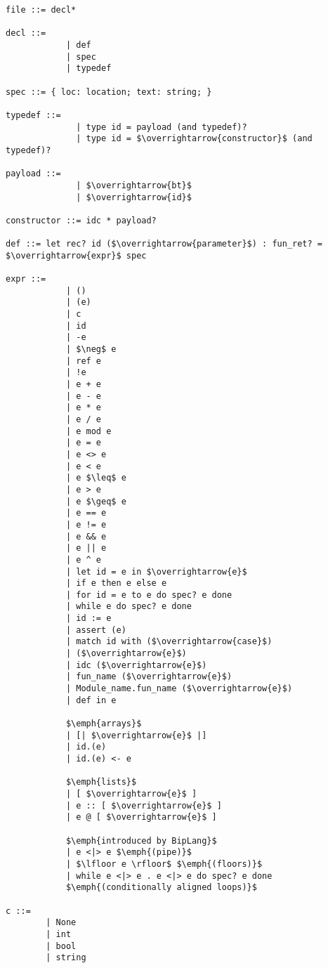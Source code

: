 \begin{lstlisting}[mathescape, basicstyle=\ttfamily, columns=flexible,
                    emph={type, and, let, rec, if, then, else, mod, in, for, while, do, done, to, begin, end, assert, match, with, of, open, include,ref},
                    emphstyle=\ttfamily\bfseries\color{myorange}]
file ::= decl*

decl ::= 
            | def
            | spec
            | typedef

spec ::= { loc: location; text: string; }

typedef ::=
              | type id = payload (and typedef)?
              | type id = $\overrightarrow{constructor}$ (and typedef)?

payload ::= 
              | $\overrightarrow{bt}$
              | $\overrightarrow{id}$

constructor ::= idc * payload?

def ::= let rec? id ($\overrightarrow{parameter}$) : fun_ret? = $\overrightarrow{expr}$ spec

expr ::=
            | ()
            | (e)
            | c
            | id
            | -e
            | $\neg$ e
            | ref e 
            | !e
            | e + e
            | e - e
            | e * e
            | e / e
            | e mod e
            | e = e
            | e <> e
            | e < e
            | e $\leq$ e
            | e > e
            | e $\geq$ e
            | e == e
            | e != e
            | e && e
            | e || e 
            | e ^ e
            | let id = e in $\overrightarrow{e}$
            | if e then e else e
            | for id = e to e do spec? e done 
            | while e do spec? e done 
            | id := e
            | assert (e)
            | match id with ($\overrightarrow{case}$)
            | ($\overrightarrow{e}$)
            | idc ($\overrightarrow{e}$)
            | fun_name ($\overrightarrow{e}$)
            | Module_name.fun_name ($\overrightarrow{e}$)
            | def in e
            
            $\emph{arrays}$
            | [| $\overrightarrow{e}$ |]
            | id.(e)
            | id.(e) <- e

            $\emph{lists}$
            | [ $\overrightarrow{e}$ ]
            | e :: [ $\overrightarrow{e}$ ]
            | e @ [ $\overrightarrow{e}$ ]

            $\emph{introduced by BipLang}$
            | e <|> e $\emph{(pipe)}$
            | $\lfloor e \rfloor$ $\emph{(floors)}$
            | while e <|> e . e <|> e do spec? e done
            $\emph{(conditionally aligned loops)}$

c ::=
        | None
        | int
        | bool
        | string

\end{lstlisting}

